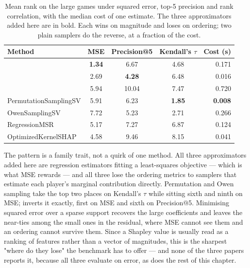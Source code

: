 \begin{table}[H]
    \centering
    \caption[Rank under three metrics, and cost, large games]{Mean rank on the large games under
        squared error, top-5 precision and rank correlation, with the median cost of one estimate.
        The three approximators added here are in bold. Each wins on magnitude and loses on
        ordering; two plain samplers do the reverse, at a fraction of the cost.}
    \label{tab:benchmark:metrics}
    \begin{tabular}{@{}lcccr@{}}
        \toprule
        Method & MSE & Precision@5 & Kendall's $\tau$ & Cost (s) \\
        \midrule
        \textbf{\oddshap{}}        & \textbf{1.34} & 6.67           & 4.68          & 0.171 \\
        \textbf{\leverageshap{}}   & 2.69          & \textbf{4.28}  & 6.48          & 0.016 \\
        \textbf{\polyshap{}}       & 5.94          & 10.04          & 7.47          & 0.720 \\
        \midrule
        PermutationSamplingSV      & 5.91          & 6.23           & \textbf{1.85} & \textbf{0.008} \\
        OwenSamplingSV             & 7.72          & 5.23           & 2.71          & 0.266 \\
        RegressionMSR              & 5.17          & 7.27           & 6.87          & 0.124 \\
        OptimizedKernelSHAP        & 4.58          & 9.46           & 8.15          & 0.041 \\
        \bottomrule
    \end{tabular}
\end{table}

The pattern is a family trait, not a quirk of one method. All three approximators added here are
regression estimators fitting a least-squares objective --- which is what MSE rewards --- and all
three lose the ordering metrics to samplers that estimate each player's marginal contribution
directly. Permutation and Owen sampling take the top two places on Kendall's $\tau$ while sitting
sixth and ninth on MSE; \oddshap{} inverts it exactly, first on MSE and sixth on Precision@5.
Minimising squared error over a sparse support recovers the large coefficients and leaves the
near-ties among the small ones in the residual, where MSE cannot see them and an ordering cannot
survive them. Since a Shapley value is usually read as a ranking of features rather than a vector
of magnitudes, this is the sharpest "where do they lose" the benchmark has to offer --- and none of
the three papers reports it, because all three evaluate on error, as does the rest of this chapter.

